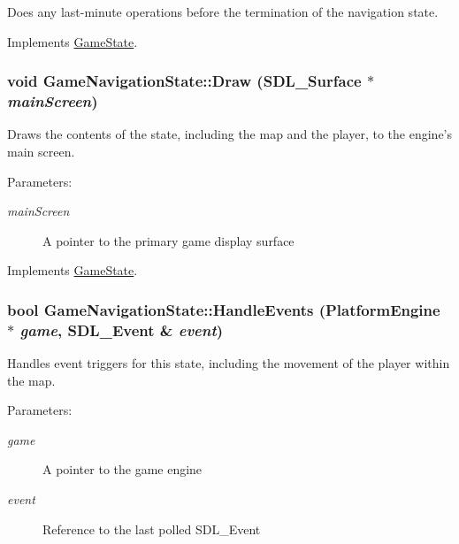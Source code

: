 Does any last-minute operations before the termination of the navigation state. 

Implements \hyperlink{class_game_state_041e7a5430d71da84745af11abdacd93}{GameState}.\hypertarget{class_game_navigation_state_e6b88e854b682be866b2aac2005278a5}{
\subsubsection[{Draw}]{\setlength{\rightskip}{0pt plus 5cm}void GameNavigationState::Draw (SDL\_\-Surface $\ast$ {\em mainScreen})}}
\label{de/d2a/class_game_navigation_state_e6b88e854b682be866b2aac2005278a5}


Draws the contents of the state, including the map and the player, to the engine's main screen.

\begin{Desc}
\item[Parameters:]
\begin{description}
\item[{\em mainScreen}]A pointer to the primary game display surface \end{description}
\end{Desc}


Implements \hyperlink{class_game_state_1b93233932defca939eed4c0676a5d2a}{GameState}.\hypertarget{class_game_navigation_state_6e7c13d35a33478673c62ae55394cfdc}{
\subsubsection[{HandleEvents}]{\setlength{\rightskip}{0pt plus 5cm}bool GameNavigationState::HandleEvents ({\bf PlatformEngine} $\ast$ {\em game}, \/  SDL\_\-Event \& {\em event})}}
\label{de/d2a/class_game_navigation_state_6e7c13d35a33478673c62ae55394cfdc}


Handles event triggers for this state, including the movement of the player within the map.

\begin{Desc}
\item[Parameters:]
\begin{description}
\item[{\em game}]A pointer to the game engine \item[{\em event}]Reference to the last polled SDL\_\-Event \end{description}
\end{Desc}


